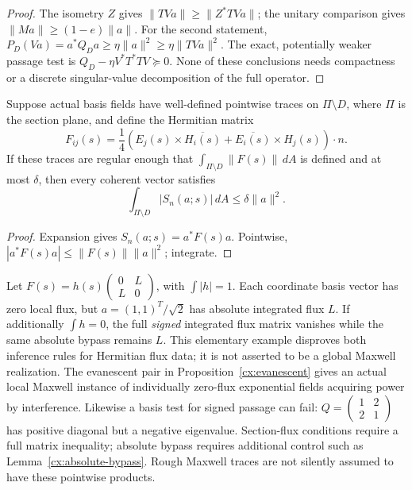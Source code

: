 \begin{proof}
The isometry $Z$ gives $\|TVa\|\geq\|Z^*TVa\|$; the unitary comparison
gives $\|Ma\|\geq(1-e)\|a\|$. For the second statement,
$P_D(Va)=a^*Q_Da\geq\eta\|a\|^2\geq\eta\|TVa\|^2$.
The exact, potentially weaker passage test is
$Q_D-\eta V^*T^*TV\succeq0$. None of these conclusions needs compactness
or a discrete singular-value decomposition of the full operator.
\end{proof}

\begin{lemma}
\label{cx:absolute-bypass}
Suppose actual basis fields have well-defined pointwise traces on
$\Pi\setminus D$, where $\Pi$ is the section plane, and define the
Hermitian matrix
\begin{equation}
 F_{ij}(s)=\frac14\left(E_j(s)\times\overline{H_i(s)}
                 +\overline{E_i(s)}\times H_j(s)\right)\cdot n.
 \label{cx:pointwise-flux}
\end{equation}
If these traces are regular enough that $\int_{\Pi\setminus D}\|F(s)\|\,dA$
is defined and at most $\delta$, then every coherent vector satisfies
\begin{equation}
 \int_{\Pi\setminus D}|S_n(a;s)|\,dA\leq\delta\|a\|^2.
 \label{cx:bypass-certificate}
\end{equation}
\end{lemma}

\begin{proof}
Expansion gives $S_n(a;s)=a^*F(s)a$. Pointwise,
$|a^*F(s)a|\leq\|F(s)\|\|a\|^2$; integrate.
\end{proof}

\begin{remark}
\label{cx:coherent-failure}
Let $F(s)=h(s)\left(\begin{smallmatrix}0&L\\L&0\end{smallmatrix}\right)$,
with $\int|h|=1$. Each coordinate basis vector has zero local flux,
but $a=(1,1)^T/\sqrt2$ has absolute integrated flux $L$. If additionally
$\int h=0$, the full \emph{signed} integrated flux matrix vanishes while
the same absolute bypass remains $L$. This elementary example disproves
both inference rules for Hermitian flux data; it is not asserted to be
a global Maxwell realization. The evanescent pair in
Proposition~\ref{cx:evanescent} gives an actual local Maxwell instance
of individually zero-flux exponential fields acquiring power by
interference. Likewise a basis test for signed passage can fail:
$Q=\left(\begin{smallmatrix}1&2\\2&1\end{smallmatrix}\right)$ has positive
diagonal but a negative eigenvalue. Section-flux conditions require a
full matrix inequality; absolute bypass requires additional control such
as Lemma~\ref{cx:absolute-bypass}. Rough Maxwell traces are not silently
assumed to have these pointwise products.
\end{remark}

